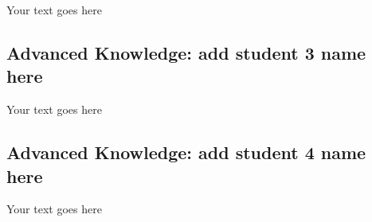 \documentclass[a4paper, 11pt]{report}
\begin{document}
	Your text goes here
	
	\subsection{Advanced Knowledge: add student 3 name here}
	
	Your text goes here
	
	\subsection{Advanced Knowledge: add student 4 name here}
	
	Your text goes here
	
	
	
	
	\newpage
	
	
	
\end{document}
